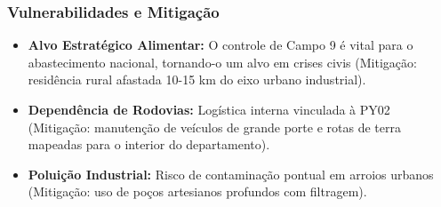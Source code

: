 \subsubsection{Vulnerabilidades e
Mitigação}

\begin{itemize}
\tightlist
\item
  \textbf{Alvo Estratégico Alimentar:} O controle de Campo 9 é vital
  para o abastecimento nacional, tornando-o um alvo em crises civis
  (Mitigação: residência rural afastada 10-15 km do eixo urbano
  industrial).
\item
  \textbf{Dependência de Rodovias:} Logística interna vinculada à PY02
  (Mitigação: manutenção de veículos de grande porte e rotas de terra
  mapeadas para o interior do departamento).
\item
  \textbf{Poluição Industrial:} Risco de contaminação pontual em arroios
  urbanos (Mitigação: uso de poços artesianos profundos com filtragem).
\end{itemize}


